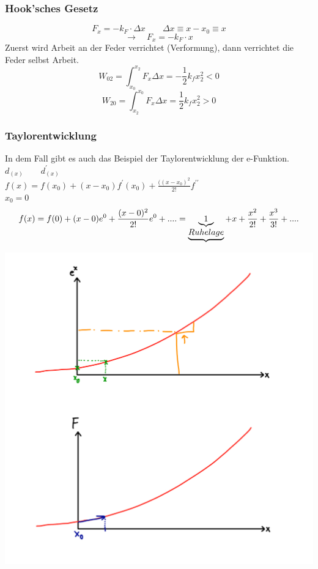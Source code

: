 \documentclass[11pt]{article}
\begin{document}
	\subsubsection{Hook'sches Gesetz}
	$$F_x=-k_F\cdot\Delta x\quad\quad\Delta x\equiv x-x_0\equiv x$$
	$$\rightarrow\quad F_x=-k_F\cdot x$$
	Zuerst wird Arbeit an der Feder verrichtet (Verformung), dann verrichtet die Feder selbst Arbeit.
	$$W_{02}=\int_{x_0}^{x_2}F_x\Delta x=-\frac{1}{2}k_fx_2^2<0$$
	$$W_{20}=\int_{x_2}^{x_0}F_x\Delta x=\frac{1}{2}k_fx_2^2>0$$
	\subsubsection{Taylorentwicklung}
	In dem Fall gibt es auch das Beispiel der Taylorentwicklung der e-Funktion.
	$d_{(x)} \qquad d^\prime_{(x)}$\\
	$f(x) = f(x_0) + (x - x_0) f^\prime(x_0) + \frac{((x -x_0)^2}{2!} f^{\prime\prime}$\\
	$x_0 = 0$
	\[ f(x) = f(0) + (x-0) e^0 + \frac{(x-0)^2}{2!}e^0 + .... \\
	= \underbrace{1}_{\underbrace{Ruhelage}} + x + \frac{x^2}{2!} + \frac{x^3}{3!}+ .... \]
	\begin{center}
		\includegraphics[scale=0.2]{IMG_94B96AE1BBE0-1.jpeg}
	\end{center}
\end{document}
